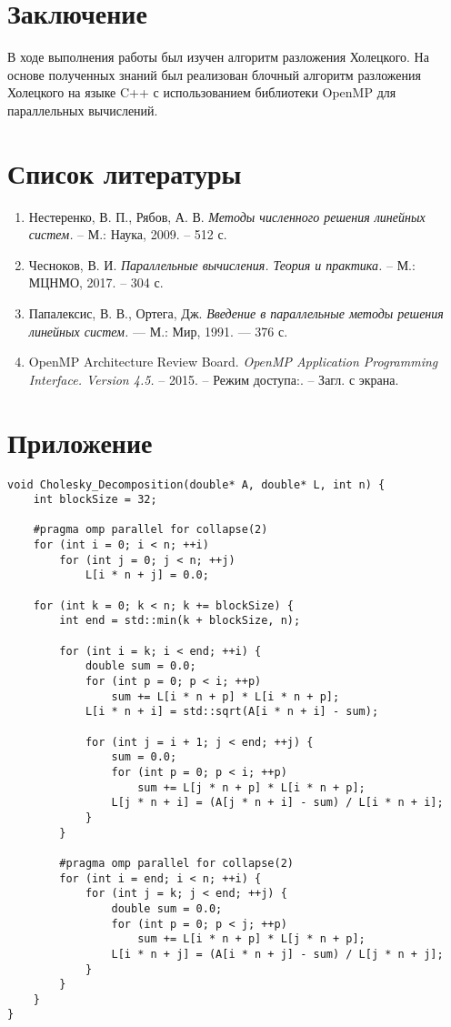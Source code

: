 \documentclass[12pt, russian]{extarticle}
\begin{document}
\begin{spacing}{1.5}
\newpage
\section{Заключение}

В ходе выполнения работы был изучен алгоритм разложения Холецкого. На основе полученных знаний был реализован блочный алгоритм разложения Холецкого на языке C++ с использованием библиотеки OpenMP для параллельных вычислений.

\newpage
\section{Список литературы}

\begin{enumerate}
    \item Нестеренко, В. П., Рябов, А. В. \textit{Методы численного решения линейных систем.} – М.: Наука, 2009. – 512 с.
    \item Чесноков, В. И. \textit{Параллельные вычисления. Теория и практика.} – М.: МЦНМО, 2017. – 304 с.
    \item Папалексис, В. В., Ортега, Дж. \textit{Введение в параллельные методы решения линейных систем.} — М.: Мир, 1991. — 376 с.
    \item OpenMP Architecture Review Board. \textit{OpenMP Application Programming Interface. Version 4.5.} – 2015. – Режим доступа:. – Загл. с экрана.
\end{enumerate}


\newpage
\section{Приложение}

\begin{verbatim}
void Cholesky_Decomposition(double* A, double* L, int n) {
    int blockSize = 32;

    #pragma omp parallel for collapse(2)
    for (int i = 0; i < n; ++i)
        for (int j = 0; j < n; ++j)
            L[i * n + j] = 0.0;

    for (int k = 0; k < n; k += blockSize) {
        int end = std::min(k + blockSize, n);

        for (int i = k; i < end; ++i) {
            double sum = 0.0;
            for (int p = 0; p < i; ++p)
                sum += L[i * n + p] * L[i * n + p];
            L[i * n + i] = std::sqrt(A[i * n + i] - sum);

            for (int j = i + 1; j < end; ++j) {
                sum = 0.0;
                for (int p = 0; p < i; ++p)
                    sum += L[j * n + p] * L[i * n + p];
                L[j * n + i] = (A[j * n + i] - sum) / L[i * n + i];
            }
        }

        #pragma omp parallel for collapse(2)
        for (int i = end; i < n; ++i) {
            for (int j = k; j < end; ++j) {
                double sum = 0.0;
                for (int p = 0; p < j; ++p)
                    sum += L[i * n + p] * L[j * n + p];
                L[i * n + j] = (A[i * n + j] - sum) / L[j * n + j];
            }
        }
    }
}
\end{verbatim}

\end{spacing}
\end{document}
